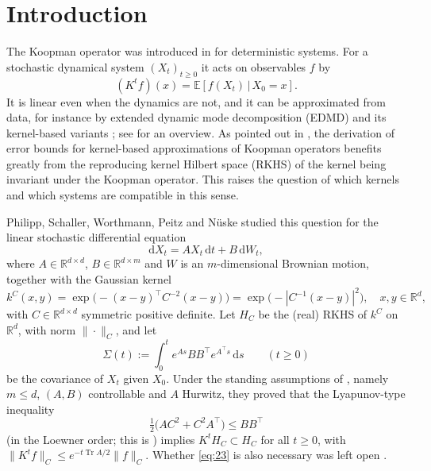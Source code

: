 \documentclass[11pt]{amsart}
\numberwithin{equation}{section}
\theoremstyle{definition}
\theoremstyle{remark}
\newcommand{\R}{\mathbb{R}}
\newcommand{\Tr}{\operatorname{Tr}}
\newcommand{\dd}{\,\mathrm{d}}
\newcommand{\tp}{\top}
\begin{document}
\section{Introduction}\label{sec:intro}

The Koopman operator was introduced in \cite{Koopman} for deterministic systems. For a stochastic dynamical
system $(X_t)_{t\ge0}$ it acts on observables $f$ by
\[
(K^tf)(x)=\mathbb E[f(X_t)\,|\,X_0=x].
\]
It is linear even when the dynamics are not, and it can be approximated from data, for instance by extended dynamic mode decomposition (EDMD) \cite{WilliamsEDMD} and its kernel-based
variants \cite{Klus,WilliamsKernel}; see \cite{Mauroy} for an overview. As pointed out in \cite{PSWPN}, the derivation
of error bounds for kernel-based approximations of Koopman operators \cite{Hertel,Koehne,Kostic,PhilippACHA} benefits greatly
from the reproducing kernel Hilbert space (RKHS) of the kernel being invariant under the Koopman operator. This raises
the question of which kernels and which systems are compatible in this sense.

Philipp, Schaller, Worthmann, Peitz and N\"uske \cite{PSWPN} studied this question for the linear stochastic
differential equation
\begin{equation}\label{eq:sde}
\mathrm dX_t=AX_t\,\mathrm dt+B\,\mathrm dW_t ,
\end{equation}
where $A\in\R^{d\times d}$, $B\in\R^{d\times m}$ and $W$ is an $m$-dimensional Brownian motion, together with the
Gaussian kernel
\[
k^C(x,y)=\exp\bigl(-(x-y)^\tp C^{-2}(x-y)\bigr)=\exp\bigl(-|C^{-1}(x-y)|^2\bigr),\quad x,y\in\R^d ,
\]
with $C\in\R^{d\times d}$ symmetric positive definite. Let $H_C$ be the (real) RKHS of $k^C$ on $\R^d$, with norm
$\|\cdot\|_C$, and let
\begin{equation}\label{eq:Sigmat}
\Sigma(t):=\int_0^te^{As}BB^\tp e^{A^\tp s}\dd s\qquad(t\ge0)
\end{equation}
be the covariance of $X_t$ given $X_0$. Under the standing assumptions of \cite{PSWPN}, namely $m\le d$, $(A,B)$
controllable and $A$ Hurwitz, they proved \cite[Theorem~2.1]{PSWPN} that the Lyapunov-type inequality
\begin{equation}\label{eq:23}
\tfrac12\bigl(AC^2+C^2A^\tp\bigr)\le BB^\tp
\end{equation}
(in the Loewner order; this is \cite[(2.3)]{PSWPN}) implies $K^tH_C\subset H_C$ for all $t\ge0$, with
$\|K^tf\|_C\le e^{-t\Tr A/2}\|f\|_C$. Whether \eqref{eq:23} is also necessary was left open
\cite[Remark~2.2(c) and Remark~4.2]{PSWPN}.
\end{document}
